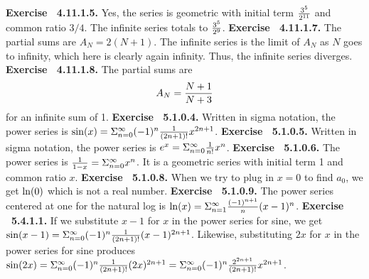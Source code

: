  {\noindent \protect \bf  Exercise ~4.11.1.5.} Yes, the series is geometric with initial term $\protect \frac  {3^5}{2^{11}}$ and common ratio $3/4$. The infinite series totals to $ \protect \frac  {3^5}{2^9}$. \protect \newline  \protect \newline  
 {\noindent \protect \bf  Exercise ~4.11.1.7.} The partial sums are $A_N=2(N+1)$. The infinite series is the limit of $A_N$ as $N$ goes to infinity, which here is clearly again infinity. Thus, the infinite series diverges. \protect \newline  \protect \newline  
 {\noindent \protect \bf  Exercise ~4.11.1.8.} The partial sums are $$A_N=\protect \frac  {N+1}{N+3}$$ for an infinite sum of 1. \protect \newline  \protect \newline  
 {\noindent \protect \bf  Exercise ~5.1.0.4.} Written in sigma notation, the power series is $\protect \qopname  \relax o{sin}(x)=\Sigma _{n=0}^\infty (-1)^{n}\protect \frac  {1}{\left (2n+1\right )!}x^{2n+1}$. \protect \newline  \protect \newline  
 {\noindent \protect \bf  Exercise ~5.1.0.5.} Written in sigma notation, the power series is $e^x=\Sigma _{n=0}^\infty \protect \frac  {1}{n!}x^{n}$. \protect \newline  \protect \newline  
 {\noindent \protect \bf  Exercise ~5.1.0.6.} The power series is $\protect \frac  {1}{1-x}=\Sigma _{n=0}^\infty x^n$. It is a geometric series with initial term 1 and common ratio $x$. \protect \newline  \protect \newline  
 {\noindent \protect \bf  Exercise ~5.1.0.8.} When we try to plug in $x=0$ to find $a_0$, we get $\protect \qopname  \relax o{ln}(0)$ which is not a real number. \protect \newline  \protect \newline  
 {\noindent \protect \bf  Exercise ~5.1.0.9.} The power series centered at one for the natural log is $\protect \qopname  \relax o{ln}(x)=\Sigma _{n=1}^\infty \protect \frac  {(-1)^{n+1}}{n}(x-1)^n$. \protect \newline  \protect \newline  
 {\noindent \protect \bf  Exercise ~5.4.1.1.} If we substitute $x-1$ for $x$ in the power series for sine, we get $\protect \qopname  \relax o{sin}(x-1)=\Sigma _{n=0}^\infty (-1)^{n}\protect \frac  {1}{\left (2n+1\right )!}(x-1)^{2n+1}$. Likewise, substituting $2x$ for $x$ in the power series for sine produces $\protect \qopname  \relax o{sin}(2x)=\Sigma _{n=0}^\infty (-1)^{n}\protect \frac  {1}{\left (2n+1\right )!}(2x)^{2n+1}=\Sigma _{n=0}^\infty (-1)^{n}\protect \frac  {2^{2n+1}}{\left (2n+1\right )!}x^{2n+1}$. \protect \newline  \protect \newline  
